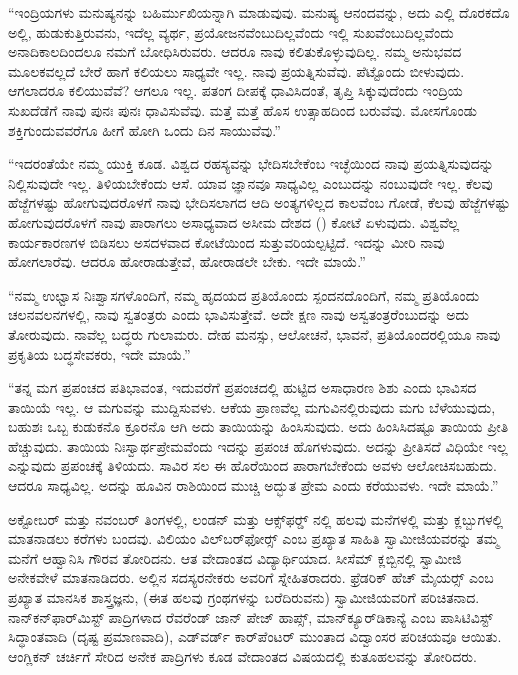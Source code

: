  “ಇಂದ್ರಿಯಗಳು ಮನುಷ್ಯನನ್ನು ಬಹಿರ್ಮುಖಿಯನ್ನಾಗಿ ಮಾಡುವುವು. ಮನುಷ್ಯ ಆನಂದವನ್ನು, ಅದು ಎಲ್ಲಿ ದೊರಕದೊ ಅಲ್ಲಿ, ಹುಡುಕುತ್ತಿರುವನು, ಇದೆಲ್ಲ ವ್ಯರ್ಥ, ಪ್ರಯೋಜನವೆಂಬುದಿಲ್ಲವೆಂದು ಇಲ್ಲಿ ಸುಖವೆಂಬುದಿಲ್ಲವೆಂದು ಅನಾದಿಕಾಲದಿಂದಲೂ ನಮಗೆ ಬೋಧಿಸಿರುವರು. ಆದರೂ ನಾವು ಕಲಿತುಕೊಳ್ಳುವುದಿಲ್ಲ. ನಮ್ಮ ಅನುಭವದ ಮೂಲಕವಲ್ಲದೆ ಬೇರೆ ಹಾಗೆ ಕಲಿಯಲು ಸಾಧ್ಯವೇ ಇಲ್ಲ. ನಾವು ಪ್ರಯತ್ನಿಸುವೆವು. ಪೆಟ್ಟೊಂದು ಬೀಳುವುದು. ಆಗಲಾದರೂ ಕಲಿಯುವೆವೆ? ಆಗಲೂ ಇಲ್ಲ. ಪತಂಗ ದೀಪಕ್ಕೆ ಧಾವಿಸಿದಂತೆ, ತೃಪ್ತಿ ಸಿಕ್ಕುವುದೆಂದು ಇಂದ್ರಿಯ ಸುಖದೆಡೆಗೆ ನಾವು ಪುನಃ ಪುನಃ ಧಾವಿಸುವೆವು. ಮತ್ತೆ ಮತ್ತೆ ಹೊಸ ಉತ್ಸಾಹದಿಂದ ಬರುವೆವು. ಮೋಸಗೊಂಡು ಶಕ್ತಿಗುಂದುವವರೆಗೂ ಹೀಗೆ ಹೋಗಿ ಒಂದು ದಿನ ಸಾಯುವೆವು.” 

 “ಇದರಂತೆಯೇ ನಮ್ಮ ಯುಕ್ತಿ ಕೂಡ. ವಿಶ್ವದ ರಹಸ್ಯವನ್ನು ಭೇದಿಸಬೇಕೆಂಬ ಇಚ್ಛೆಯಿಂದ ನಾವು ಪ್ರಯತ್ನಿಸುವುದನ್ನು ನಿಲ್ಲಿಸುವುದೇ ಇಲ್ಲ. ತಿಳಿಯಬೇಕೆಂದು ಆಸೆ. ಯಾವ ಜ್ಞಾನವೂ ಸಾಧ್ಯವಿಲ್ಲ ಎಂಬುದನ್ನು ನಂಬುವುದೇ ಇಲ್ಲ. ಕೆಲವು ಹೆಜ್ಜೆಗಳಷ್ಟು ಹೋಗುವುದರೊಳಗೆ ನಾವು ಭೇದಿಸಲಾಗದ ಆದಿ ಅಂತ್ಯಗಳಿಲ್ಲದ ಕಾಲವೆಂಬ ಗೋಡೆ, ಕೆಲವು ಹೆಜ್ಜೆಗಳಷ್ಟು ಹೋಗುವುದರೊಳಗೆ ನಾವು ಪಾರಾಗಲು ಅಸಾಧ್ಯವಾದ ಅಸೀಮ ದೇಶದ () ಕೋಟೆ ಏಳುವುದು. ವಿಶ್ವವೆಲ್ಲ ಕಾರ್ಯಕಾರಣಗಳ ಬಿಡಿಸಲು ಅಸದಳವಾದ ಕೋಟೆಯಿಂದ ಸುತ್ತುವರಿಯಲ್ಪಟ್ಟಿದೆ. ಇದನ್ನು ಮೀರಿ ನಾವು ಹೋಗಲಾರೆವು. ಆದರೂ ಹೋರಾಡುತ್ತೇವೆ, ಹೋರಾಡಲೇ ಬೇಕು. ಇದೇ ಮಾಯೆ.” 

 “ನಮ್ಮ ಉಛ್ವಾಸ ನಿಃಶ್ವಾಸಗಳೊಂದಿಗೆ, ನಮ್ಮ ಹೃದಯದ ಪ್ರತಿಯೊಂದು ಸ್ಪಂದನದೊಂದಿಗೆ, ನಮ್ಮ ಪ್ರತಿಯೊಂದು ಚಲನವಲನಗಳಲ್ಲಿ, ನಾವು ಸ್ವತಂತ್ರರು ಎಂದು ಭಾವಿಸುತ್ತೇವೆ. ಅದೇ ಕ್ಷಣ ನಾವು ಅಸ್ವತಂತ್ರರೆಂಬುದನ್ನು ಅದು ತೋರುವುದು. ನಾವೆಲ್ಲ ಬದ್ಧರು ಗುಲಾಮರು. ದೇಹ ಮನಸ್ಸು, ಆಲೋಚನೆ, ಭಾವನೆ, ಪ್ರತಿಯೊಂದರಲ್ಲಿಯೂ ನಾವು ಪ್ರಕೃತಿಯ ಬದ್ಧಸೇವಕರು, ಇದೇ ಮಾಯೆ.” 

 “ತನ್ನ ಮಗ ಪ್ರಪಂಚದ ಪತಿಭಾವಂತ, ಇದುವರೆಗೆ ಪ್ರಪಂಚದಲ್ಲಿ ಹುಟ್ಟಿದ ಅಸಾಧಾರಣ ಶಿಶು ಎಂದು ಭಾವಿಸದ ತಾಯಿಯೆ ಇಲ್ಲ. ಆ ಮಗುವನ್ನು ಮುದ್ದಿಸುವಳು. ಆಕೆಯ ಪ್ರಾಣವೆಲ್ಲ ಮಗುವಿನಲ್ಲಿರುವುದು ಮಗು ಬೆಳೆಯುವುದು, ಬಹುಶಃ ಒಬ್ಬ ಕುಡುಕನೊ ಕ್ರೂರನೊ ಆಗಿ ಅದು ತಾಯಿಯನ್ನು ಹಿಂಸಿಸುವುದು. ಅದು ಹಿಂಸಿಸಿದಷ್ಟೂ ತಾಯಿಯ ಪ್ರೀತಿ ಹೆಚ್ಚುವುದು. ತಾಯಿಯ ನಿಃಸ್ವಾರ್ಥಪ್ರೇಮವೆಂದು ಇದನ್ನು ಪ್ರಪಂಚ ಹೊಗಳುವುದು. ಅದನ್ನು ಪ್ರೀತಿಸದೆ ವಿಧಿಯೇ ಇಲ್ಲ ಎನ್ನುವುದು ಪ್ರಪಂಚಕ್ಕೆ ತಿಳಿಯದು. ಸಾವಿರ ಸಲ ಈ ಹೊರೆಯಿಂದ ಪಾರಾಗಬೇಕೆಂದು ಅವಳು ಆಲೋಚಿಸಬಹುದು. ಆದರೂ ಸಾಧ್ಯವಿಲ್ಲ. ಅದನ್ನು ಹೂವಿನ ರಾಶಿಯಿಂದ ಮುಚ್ಚಿ ಅದ್ಭುತ ಪ್ರೇಮ ಎಂದು ಕರೆಯುವಳು. ಇದೇ ಮಾಯೆ.” 

 ಅಕ್ಟೋಬರ್ ಮತ್ತು ನವಂಬರ್ ತಿಂಗಳಲ್ಲಿ, ಲಂಡನ್ ಮತ್ತು ಆಕ್ಸ್‌ಫರ್ಡ್‍ ನಲ್ಲಿ ಹಲವು ಮನೆಗಳಲ್ಲಿ ಮತ್ತು ಕ್ಲಬ್ಬುಗಳಲ್ಲಿ ಮಾತನಾಡಲು ಕರೆಗಳು ಬಂದವು. ವಿಲಿಯಂ ವಿಲ್‌ಬರ್‌ಫೋರ್ಸ್‍ ಎಂಬ ಪ್ರಖ್ಯಾತ ಸಾಹಿತಿ ಸ್ವಾಮೀಜಿಯವರನ್ನು ತಮ್ಮ ಮನೆಗೆ ಆಹ್ವಾನಿಸಿ ಗೌರವ ತೋರಿದನು. ಆತ ವೇದಾಂತದ ವಿದ್ಯಾರ್ಥಿಯಾದ. ಸೀಸೆಮ್ ಕ್ಲಬ್ಬಿನಲ್ಲಿ ಸ್ವಾಮೀಜಿ ಅನೇಕವೇಳೆ ಮಾತನಾಡಿದರು. ಅಲ್ಲಿನ ಸದಸ್ಯರನೇಕರು ಅವರಿಗೆ ಸ್ನೇಹಿತರಾದರು. ಫ್ರೆಡರಿಕ್ ಹೆಚ್ ಮೈಯರ್ಸ್‍ ಎಂಬ ಪ್ರಖ್ಯಾತ ಮಾನಸಿಕ ಶಾಸ್ತ್ರಜ್ಞನು, (ಈತ ಹಲವು ಗ್ರಂಥಗಳನ್ನು ಬರೆದಿರುವನು) ಸ್ವಾಮೀಜಿಯವರಿಗೆ ಪರಿಚಿತನಾದ. ನಾನ್‌ಕನ್‌ಫಾರ್‌ಮಿಸ್ಟ್ ಪಾದ್ರಿಗಳಾದ ರೆವರೆಂಡ್ ಜಾನ್ ಪೇಜ್ ಹಾಪ್ಸ್, ಮಾನ್‌ಕ್ಯೂರ್‌ಡಿಕಾನ್ಯೆ ಎಂಬ ಪಾಸಿಟಿವಿಸ್ಟ್ ಸಿದ್ಧಾಂತವಾದಿ (ದೃಷ್ಟ ಪ್ರಮಾಣವಾದಿ), ಎಡ್‌ವರ್ಡ್ ಕಾರ್‌ಪೆಂಟರ್ ಮುಂತಾದ ವಿದ್ವಾಂಸರ ಪರಿಚಯವೂ ಆಯಿತು. ಆಂಗ್ಲಿಕನ್ ಚರ್ಚಿಗೆ ಸೇರಿದ ಅನೇಕ ಪಾದ್ರಿಗಳು ಕೂಡ ವೇದಾಂತದ ವಿಷಯದಲ್ಲಿ ಕುತೂಹಲವನ್ನು ತೋರಿದರು. 

